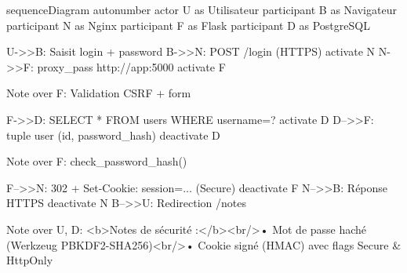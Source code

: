 sequenceDiagram
    autonumber
    actor U as Utilisateur
    participant B as Navigateur
    participant N as Nginx
    participant F as Flask
    participant D as PostgreSQL

    U->>B: Saisit login + password
    B->>N: POST /login (HTTPS)
    activate N
    N->>F: proxy_pass http://app:5000
    activate F
    
    Note over F: Validation CSRF + form
    
    F->>D: SELECT * FROM users WHERE username=?
    activate D
    D-->>F: tuple user (id, password_hash)
    deactivate D
    
    Note over F: check_password_hash()
    
    F-->>N: 302 + Set-Cookie: session=... (Secure)
    deactivate F
    N-->>B: Réponse HTTPS
    deactivate N
    B-->>U: Redirection /notes

    Note over U, D: <b>Notes de sécurité :</b><br/>• Mot de passe haché (Werkzeug PBKDF2-SHA256)<br/>• Cookie signé (HMAC) avec flags Secure & HttpOnly